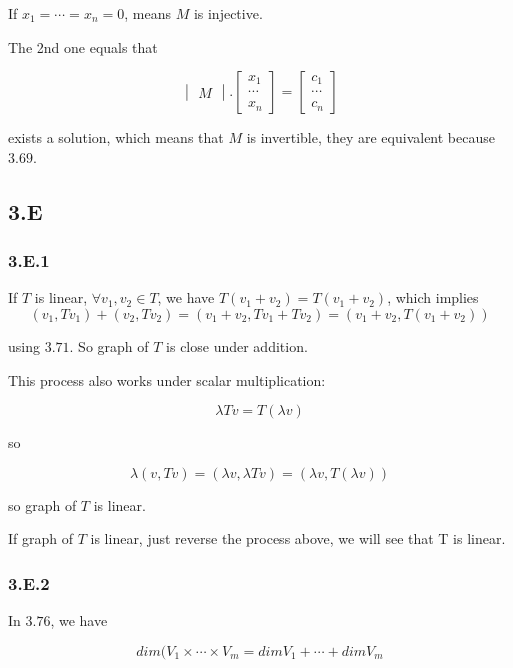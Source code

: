 If $x_{1} = \cdots = x_{n} = 0$, means $M$ is injective.

The 2nd one equals that

\begin{equation}
    \begin{vmatrix}
    M
    \end{vmatrix} . 
    \begin{bmatrix}
    x_{1} \\ \cdots \\ x_{n}
    \end{bmatrix} = 
    \begin{bmatrix}
    c_{1} \\ \cdots \\ c_{n}
    \end{bmatrix}
\end{equation}

exists a solution, which means that $M$ is invertible, 
they are equivalent because $3.69$.

\subsection*{3.E}
\subsubsection*{3.E.1}

If $T$ is linear, $\forall v_{1}, v_{2} \in T$, we have $T(v_{1} + v_{2}) = T(v_{1}+v_{2})$, which implies 
\[(v_{1}, Tv_{1}) + (v_{2}, Tv_{2}) = (v_{1}+v_{2}, Tv_{1} + Tv_{2}) = (v_{1} + v_{2}, T(v_{1} + v_{2}))\]

using $3.71$. So graph of $T$ is close under addition.

This process also works under scalar multiplication:

\[\lambda Tv = T(\lambda v)\]

so 

\[\lambda (v, Tv) = (\lambda v, \lambda Tv) = (\lambda v, T(\lambda v))\]

so graph of $T$ is linear.

If graph of $T$ is linear, just reverse the process above, we will see that T is linear.

\subsubsection*{3.E.2}

In $3.76$, we have 

\[dim(V_{1} \times \cdots \times V_{m} = dim V_{1} + \cdots + dim V_{m}\] 

